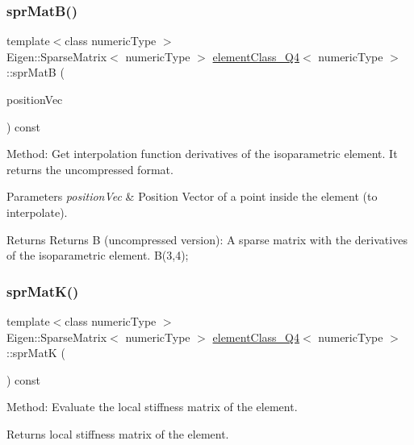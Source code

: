 \subsubsection{\texorpdfstring{spr\+Mat\+B()}{sprMatB()}}
{\footnotesize\ttfamily template$<$class numeric\+Type $>$ \\
Eigen\+::\+Sparse\+Matrix$<$ numeric\+Type $>$ \mbox{\hyperlink{classelement_class___q4}{element\+Class\+\_\+\+Q4}}$<$ numeric\+Type $>$\+::spr\+MatB (\begin{DoxyParamCaption}\item[{const Matrix$<$ numeric\+Type, 2, 1 $>$ \&}]{position\+Vec }\end{DoxyParamCaption}) const}

Method\+: Get interpolation function derivatives of the isoparametric element. It returns the uncompressed format. 
\begin{DoxyParams}{Parameters}
{\em position\+Vec} & Position Vector of a point inside the element (to interpolate). \\
\hline
\end{DoxyParams}
\begin{DoxyReturn}{Returns}
Returns B (uncompressed version)\+: A sparse matrix with the derivatives of the isoparametric element. B(3,4); 
\end{DoxyReturn}
\mbox{\label{classelement_class___q4_a0063f8e857239df14972ebcd95b9cdca}} 
\subsubsection{\texorpdfstring{spr\+Mat\+K()}{sprMatK()}}
{\footnotesize\ttfamily template$<$class numeric\+Type $>$ \\
Eigen\+::\+Sparse\+Matrix$<$ numeric\+Type $>$ \mbox{\hyperlink{classelement_class___q4}{element\+Class\+\_\+\+Q4}}$<$ numeric\+Type $>$\+::spr\+MatK (\begin{DoxyParamCaption}{ }\end{DoxyParamCaption}) const}

Method\+: Evaluate the local stiffness matrix of the element. \begin{DoxyReturn}{Returns}
local stiffness matrix of the element. 
\end{DoxyReturn}
\mbox{\label{classelement_class___q4_adc47e0786349f327fe45e3744080d3c5}} 
